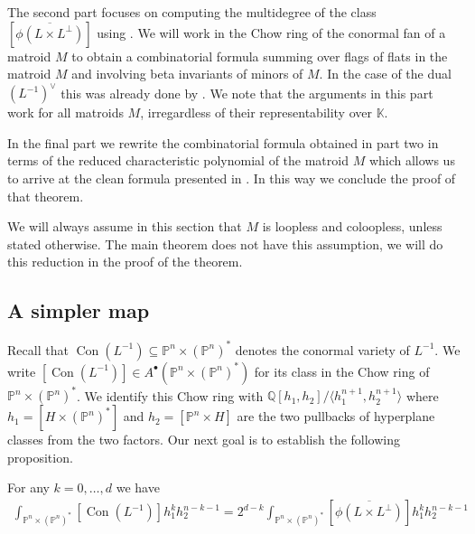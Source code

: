 \documentclass[12pt,a4paper,english]{scrartcl}
\newcommand{\QQ}{\mathbb{Q}}
\newcommand{\KK}{\mathbb{K}}
\newcommand{\PP}{\mathbb{P}}
\DeclareMathOperator{\Con}{Con}
\begin{document}
The second part focuses on computing the multidegree of the class $[\overline{\phi(L\times L^\perp)}]$ using . We will work in the Chow ring of the conormal fan of a matroid $M$ to obtain a combinatorial formula summing over flags of flats in the matroid $M$ and involving  beta invariants of minors of $M$. In the case of the dual $(L^{-1})^\vee$ this was already done by \cite[Proposition 4.9]{Ardila2022}. We note that the arguments in this part work for all matroids $M$, irregardless of their representability over $\KK$.

In the final part we rewrite the combinatorial formula obtained in part two in terms of the reduced characteristic polynomial of the matroid $M$ which allows us to arrive at the clean formula presented in . In this way we conclude the proof of that theorem.

We will always assume in this section that $M$ is loopless and coloopless, unless stated otherwise. The main theorem does not have this assumption, we will do this reduction in the proof of the theorem.

\subsection{A simpler map} \label{sec:swimming}

Recall that $\Con(L^{-1})\subseteq \PP^n\times (\PP^n)^*$ denotes the conormal variety of $L^{-1}$. We write $[\Con(L^{-1})]\in A^\bullet(\PP^n\times (\PP^n)^*)$ for its class in the Chow ring of $\PP^n\times (\PP^n)^*$. We identify this Chow ring with $\QQ[h_1,h_2]/\langle h_1^{n+1},h_2^{n+1}\rangle$ where $h_1=[H\times (\PP^n)^*]$ and $h_2=[\PP^n\times H]$ are the two pullbacks of hyperplane classes from the two factors. Our next goal is to establish the following proposition.
\begin{proposition}
\label{prop:gettingridof2}
    For any $k=0,\ldots,d$ we have \begin{align*}
            \int_{\PP^n\times (\PP^n)^*}[\Con(L^{-1})]h_1^kh_2^{n-k-1}=2^{d-k}\int_{\PP^n\times (\PP^n)^*}[\overline{\phi(L\times L^\perp)}] h_1^kh_2^{n-k-1}
    \end{align*}
\end{proposition}
\end{document}
